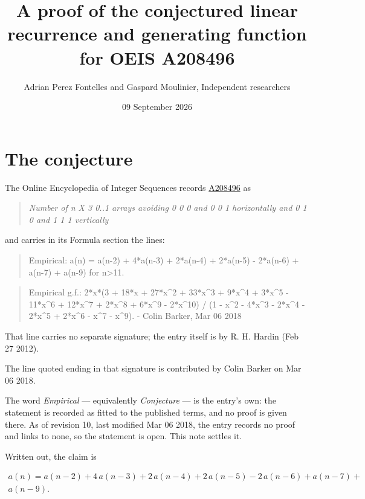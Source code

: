 \documentclass[11pt]{article}
\title{A proof of the conjectured linear recurrence and generating function for OEIS A208496}
\author{Adrian Perez Fontelles and Gaspard Moulinier, Independent researchers}
\date{09 September 2026}
\theoremstyle{definition}
\begin{document}
\maketitle
\section{The conjecture}

The Online Encyclopedia of Integer Sequences records \href{https://oeis.org/A208496}{A208496} as

\begin{quote}\itshape Number of n X 3 0..1 arrays avoiding 0 0 0 and 0 0 1 horizontally and 0 1 0 and 1 1 1 vertically\end{quote}

and carries in its Formula section the lines:

\begin{quote}\ttfamily Empirical: a(n) = a(n-2) + 4*a(n-3) + 2*a(n-4) + 2*a(n-5) - 2*a(n-6) + a(n-7) + a(n-9) for n>11.\end{quote}

\begin{quote}\ttfamily Empirical g.f.: 2*x*(3 + 18*x + 27*x\textasciicircum{}2 + 33*x\textasciicircum{}3 + 9*x\textasciicircum{}4 + 3*x\textasciicircum{}5 - 11*x\textasciicircum{}6 + 12*x\textasciicircum{}7 + 2*x\textasciicircum{}8 + 6*x\textasciicircum{}9 - 2*x\textasciicircum{}10) / (1 - x\textasciicircum{}2 - 4*x\textasciicircum{}3 - 2*x\textasciicircum{}4 - 2*x\textasciicircum{}5 + 2*x\textasciicircum{}6 - x\textasciicircum{}7 - x\textasciicircum{}9). - Colin Barker, Mar 06 2018\end{quote}

That line carries no separate signature; the entry itself is by R. H. Hardin (Feb 27 2012).

The line quoted ending in that signature is contributed by Colin Barker on Mar 06 2018.

The word {\itshape Empirical} --- equivalently {\itshape Conjecture} --- is the entry's own: the statement is recorded as fitted to the published terms, and no proof is given there. As of revision 10, last modified Mar 06 2018, the entry records no proof and links to none, so the statement is open. This note settles it.

Written out, the claim is

\begin{multline*} a(n) = a(n-2) + 4\,a(n-3) + 2\,a(n-4) + 2\,a(n-5) - 2\,a(n-6) + a(n-7) + \\ a(n-9). \end{multline*}
\end{document}
